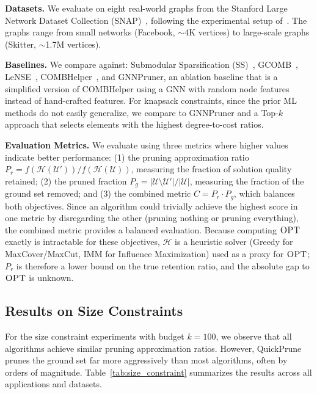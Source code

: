 \textbf{Datasets.} We evaluate on eight real-world graphs from the Stanford Large Network
Dataset Collection (SNAP)~\citep{leskovec2016snap}, following the experimental setup
of~\citep{ireland2022lense}. The graphs range from small networks
(Facebook, $\sim$4K vertices) to large-scale graphs (Skitter, $\sim$1.7M vertices).

\textbf{Baselines.} We compare against: Submodular Sparsification (SS)~\citep{zhou2017scaling},
GCOMB~\citep{manchanda2020gcomb}, LeNSE~\citep{ireland2022lense},
COMBHelper~\citep{tian2024combhelper}, and GNNPruner, an ablation baseline that is a
simplified version of COMBHelper using a GNN with random node features instead of
hand-crafted features. For knapsack constraints, since the prior ML
methods do not easily generalize, we compare to GNNPruner and a Top-$k$ approach that
selects elements with the highest degree-to-cost ratios.

\textbf{Evaluation Metrics.} We evaluate using three metrics where higher values indicate
better performance: (1) the pruning approximation ratio
$P_r = f(\mathcal{H}(\mathcal{U}')) / f(\mathcal{H}(\mathcal{U}))$, measuring the
fraction of solution quality retained; (2) the pruned fraction
$P_g = |\mathcal{U} \setminus \mathcal{U}'| / |\mathcal{U}|$, measuring the fraction of
the ground set removed; and (3) the combined metric $C = P_r \cdot P_g$, which balances
both objectives. Since an algorithm could trivially achieve the highest score in one metric
by disregarding the other (pruning nothing or pruning everything), the combined metric
provides a balanced evaluation. Because computing $\textsc{OPT}$ exactly is intractable for these objectives, $\mathcal{H}$ is a
heuristic solver (Greedy for MaxCover/MaxCut, IMM for Influence Maximization) used as a
proxy for $\textsc{OPT}$; $P_r$ is therefore a lower bound on the true retention ratio, and the
absolute gap to $\textsc{OPT}$ is unknown.


\subsection{Results on Size Constraints}

For the size constraint experiments with budget $k = 100$, we observe that all algorithms
achieve similar pruning approximation ratios. However, QuickPrune prunes the ground set far more aggressively than most algorithms, often by orders of magnitude. Table~\ref{tab:size_constraint}
summarizes the results across all applications and datasets.

